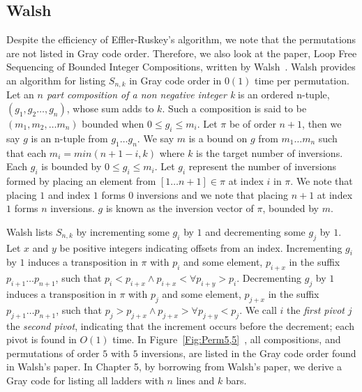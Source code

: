\subsection{Walsh} 
Despite the efficiency of Effler-Ruskey's algorithm, we note that the permutations are not listed in Gray code order. Therefore, we 
also look at the paper, Loop Free Sequencing of Bounded Integer Compositions, written by Walsh~\cite{A41}. Walsh provides an algorithm for listing 
$S_{n,k}$ in Gray code order in $0(1)$ time per permutation.  
Let an \emph{$n$ part composition of a non negative integer k} is an ordered n-tuple, $(g_{1},g_{2}  \dots ,g_{n})$, whose 
sum adds to $k$.
Such a composition is said to be $(m_{1},m_{2}, \dots m_{n})$ bounded when $0 \leq g_{i} \leq m_{i}$. Let $\pi$ be 
of order $n+1$, then we say $g$ is an n-tuple from $g_{1} \dots g_{n}$. We say $m$ is a bound on $g$ from 
$m_{1} \dots m_{n}$ such that each $m_{i}=min(n+1 - i, k)$ where $k$ is the target number of 
inversions. Each $g_{i}$ is bounded by $0 \leq g_{i} \leq m_{i}$. Let $g_{i}$ represent the 
number of inversions formed by placing an element from $[1 \dots n+1] \in \pi$ 
at index $i$ in $\pi$. We note that placing $1$ and index $1$ forms $0$ inversions and we note that 
placing $n+1$ at index $1$ forms $n$ inversions. $g$ is known as the inversion vector of $\pi$, bounded by $m$.\par 
Walsh lists $S_{n,k}$ by incrementing some $g_{i}$ by $1$ and decrementing some $g_{j}$ by $1$. Let $x$ and $y$ be positive integers indicating 
offsets from an index. Incrementing $g_{i}$ 
by $1$ induces a transposition in $\pi$ with $p_{i}$ and some element, $p_{i+x}$ in the suffix $p_{i+1} \dots p_{n+1}$, such that 
$p_{i} < p_{i+x} \wedge p_{i+x} < \forall p_{i+y}>p_{i}$. Decrementing $g_{j}$ by $1$ induces a transposition in 
$\pi$ with $p_{j}$ and some element, $p_{j+x}$ in the suffix $p_{j+1} \dots p_{n+1}$, such that $p_{j} > p_{j+x} \wedge p_{j+x} > \forall p_{j+y}<p_{j}$. 
We call $i$ the \emph{first pivot} $j$ the \emph{second pivot}, indicating that the increment occurs before the decrement; each pivot is found in 
$O(1)$ time. In Figure~\ref{Fig:Perm5,5}~\cite{A41}, all compositions, and permutations of order $5$ with $5$ inversions, are listed in the Gray code order 
found in Walsh's paper. In Chapter 5, by borrowing from Walsh's paper, we derive a Gray code for listing all ladders with $n$ lines and $k$ bars. 
